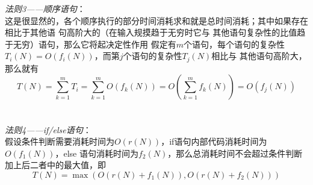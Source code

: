 \documentclass[a4paper,12pt]{ctexart}
\begin{document}
		\indent \textit{法则3——顺序语句}：\\
		\indent 这是很显然的，各个顺序执行的部分时间消耗求和就是总时间消耗；其中如果存在相比于其他语
		句高阶大的（在输入规摸趋于无穷时它与 其他语句复杂性的比值趋于无穷）语句，那么它将起决定性作用
		假定有$m$个语句，每个语句的复杂性$T_i(N)=O(f_i(N))$，而第$j$个语句的复杂性$T_j(N)$相比与
		其他语句高阶大，那么就有
		$$
		T(N)=\sum_{k=1}^mT_i=\sum_{k=1}^mO(f_k(N))=O(\sum_{k=1}^mf_k(N))=O(f_j(N))
		$$
		\\ \\
		\indent \textit{法则4——if/else语句}：\\
		\indent 假设条件判断需要消耗时间为$O(r(N))$，if语句内部代码消耗时间为$O(f_1(N))$，else
		语句消耗时间为$f_2(N)$，那么总消耗时间不会超过条件判断加上后二者中的最大值，即
		$$
		T(N)=\max(O(r(N)+f_1(N)),O(r(N)+f_2(N)))
		$$
\end{document}
